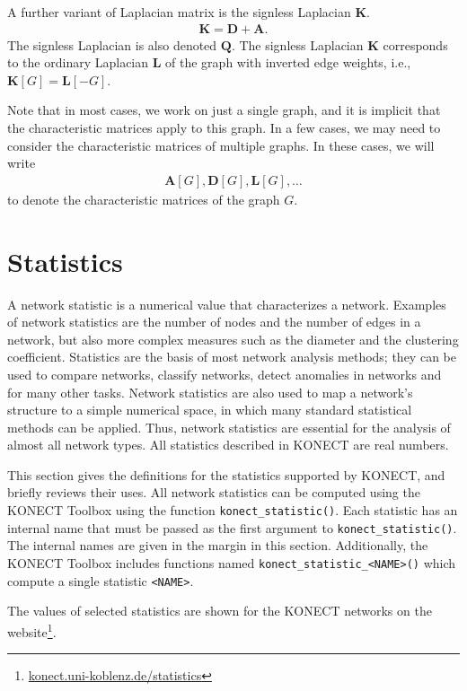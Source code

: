 \documentclass{article}
\begin{document}
A further variant of Laplacian matrix is the signless Laplacian $\mathbf
K$. 
\begin{align}
  \mathbf K = \mathbf D + \mathbf A. 
\end{align}
The signless Laplacian is also denoted $\mathbf Q$. 
The signless Laplacian $\mathbf K$ corresponds to the ordinary Laplacian
$\mathbf L$ of the graph with inverted edge weights, i.e., $\mathbf K[G] =
\mathbf L[-G]$. 

Note that in most cases, we work on just a single graph, and it is
implicit that the characteristic matrices apply to this graph.  In a few
cases, we may need to consider the characteristic matrices of multiple
graphs.  In these cases, we will write
\begin{align*}
  \mathbf A[G], \mathbf D[G], \mathbf L[G], \dotsc
\end{align*}
to denote the characteristic matrices of the graph $G$. 

\section{Statistics}
\label{sec:statistics}
A network statistic is a numerical value that characterizes a network.
Examples of network statistics are the number of nodes and the number of
edges in a network, but also more complex measures such as the diameter and the
clustering coefficient.  
Statistics are the basis of most network analysis methods; they can be
used to compare networks, classify networks, detect anomalies in
networks and for many other tasks.  Network statistics are also used to map a network's structure
to a simple numerical space, in which many standard statistical
methods can be applied.  Thus, network statistics are essential for the
analysis of almost all network types. 
All statistics described in KONECT are real numbers.  

This section gives the definitions for the statistics supported by
KONECT, and briefly reviews their uses.  
All network statistics can be computed using the KONECT Toolbox using
the function \texttt{konect\_statistic()}. Each statistic has an
internal name that must be passed as the first argument to
\texttt{konect\_statistic()}.  The internal names are given in the
margin in this section. 
Additionally, the KONECT Toolbox includes functions named
\texttt{konect\_statistic\_<NAME>()} which compute a single statistic
\texttt{<NAME>}. 

The values of selected statistics are
shown for the KONECT networks on the
website\footnote{\href{http://konect.uni-koblenz.de/statistics/}{konect.uni-koblenz.de/statistics}}.  
\end{document}
